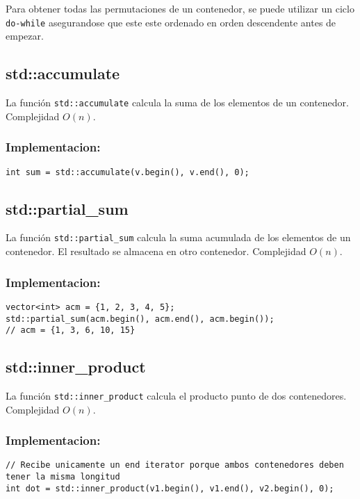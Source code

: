 Para obtener todas las permutaciones de un contenedor, se puede utilizar un ciclo \texttt{do-while} asegurandose que este este ordenado en orden descendente antes de empezar.

\subsection{std::accumulate}
\label{subsec:std_accumulate}
La función \texttt{std::accumulate} calcula la suma de los elementos de un contenedor. Complejidad $O(n)$. 

\subsubsection{Implementacion:}
\begin{lstlisting}
int sum = std::accumulate(v.begin(), v.end(), 0);
\end{lstlisting}

\subsection{std::partial\_sum}
\label{subsec:std_partial_sum}
La función \texttt{std::partial\_sum} calcula la suma acumulada de los elementos de un contenedor. El resultado se almacena en otro contenedor. Complejidad $O(n)$.

\subsubsection{Implementacion:}
\begin{lstlisting}
vector<int> acm = {1, 2, 3, 4, 5};
std::partial_sum(acm.begin(), acm.end(), acm.begin());
// acm = {1, 3, 6, 10, 15}
\end{lstlisting}

\subsection{std::inner\_product}
\label{subsec:std_inner_product}
La función \texttt{std::inner\_product} calcula el producto punto de dos contenedores. Complejidad $O(n)$.

\subsubsection{Implementacion:}
\begin{lstlisting}
// Recibe unicamente un end iterator porque ambos contenedores deben tener la misma longitud
int dot = std::inner_product(v1.begin(), v1.end(), v2.begin(), 0);
\end{lstlisting}

